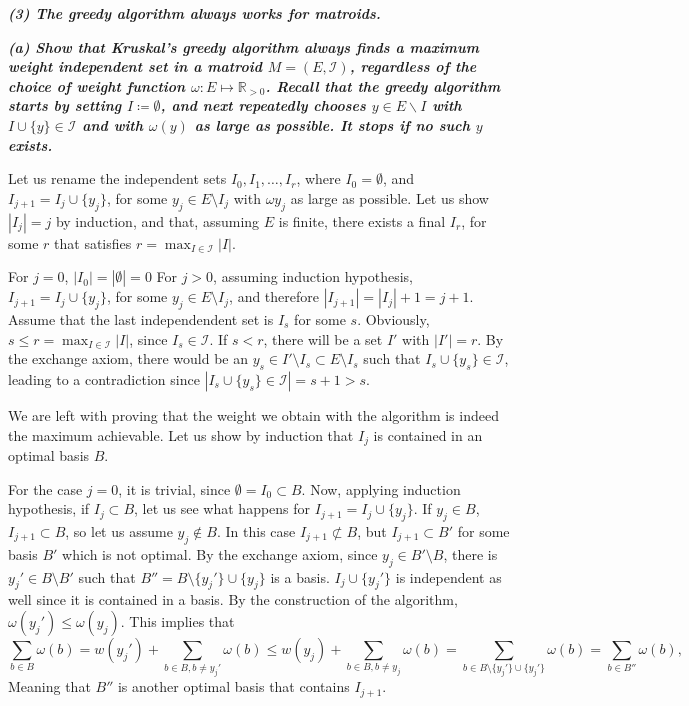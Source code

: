 \textbf{\textit{(3) The greedy algorithm always works for matroids.}}

\hspace{5pt}\textbf{\textit{(a) Show that Kruskal's greedy algorithm always finds a maximum weight independent set in a matroid $M = (E, \mathcal{I})$, regardless of the choice of weight function $\omega : E \mapsto \mathbb{R}_{>0}$. Recall that the greedy algorithm starts by setting $I \coloneqq \emptyset$, and next repeatedly chooses $y \in E \backslash I$ with $I \cup \lbrace y \rbrace \in \mathcal{I}$ and with $\omega(y)$ as large as possible. It stops if no such $y$ exists.}}

\vspace{3pt}

Let us rename the independent sets $I_0, I_1, \ldots, I_r$, where $I_0 = \emptyset$, and $I_{j+1} = I_j \cup \{y_j\}$, for some $y_j \in E \setminus I_j$ with $\omega y_j$ as large as possible. Let us show $|I_j| = j$ by induction, and that, assuming $E$ is finite, there exists a final $I_r$, for some $r$ that satisfies $r = \max_{I \in \mathcal I} |I|$.

For $j = 0$, $|I_0| = |\emptyset| = 0$
For $j > 0$, assuming induction hypothesis, $I_{j+1} = I_j \cup \{y_j\}$, for some $y_j \in E \setminus I_j$, and therefore $|I_{j+1}| = |I_j| + 1 = j + 1$. Assume that the last independendent set is $I_s$ for some $s$. Obviously, $s \leq r = \max_{I \in \mathcal I} |I|$, since $I_s \in \mathcal I$. If $s < r$, there will be a set $I'$ with $|I'| = r$. By the exchange axiom, there would be an $y_s \in I' \setminus I_s \subset E \setminus I_s$ such that $I_s \cup \{y_s\} \in \mathcal I$, leading to a contradiction since $|I_s \cup \{y_s\} \in \mathcal I| = s + 1 > s$.

We are left with proving that the weight we obtain with the algorithm is indeed the maximum achievable. Let us show by induction that $I_j$ is contained in an optimal basis $B$.

For the case $j = 0$, it is trivial, since $\emptyset = I_0 \subset B$. Now, applying induction hypothesis, if $I_j \subset B$, let us see what happens for $I_{j+1} = I_j \cup \{y_j\}$. If $y_j \in B$, $I_{j+1} \subset B$, so let us assume $y_j \notin B$. In this case $I_{j+1} \not\subset B$, but $I_{j+1} \subset B'$ for some basis $B'$ which is not optimal. By the exchange axiom, since $y_j \in B' \setminus B$, there is $y_j' \in B \setminus B'$ such that $B'' = B \setminus \{y_j'\} \cup \{y_j\}$ is a basis. $I_j \cup \{y_j'\}$ is independent as well since it is contained in a basis. By the construction of the algorithm, $\omega(y_j') \leq \omega(y_j)$. This implies that
\[
\sum_{b \in B} \omega(b) =
w(y_j') + \sum_{b \in B, b \neq y_j'} \omega(b) \leq
w(y_j) + \sum_{b \in B, b \neq y_j} \omega(b) =
\sum_{b \in B \setminus \{y_j'\} \cup \{y_j'\}} \omega(b) =
\sum_{b \in B''} \omega(b),
\]
Meaning that $B''$ is another optimal basis that contains $I_{j+1}$.

